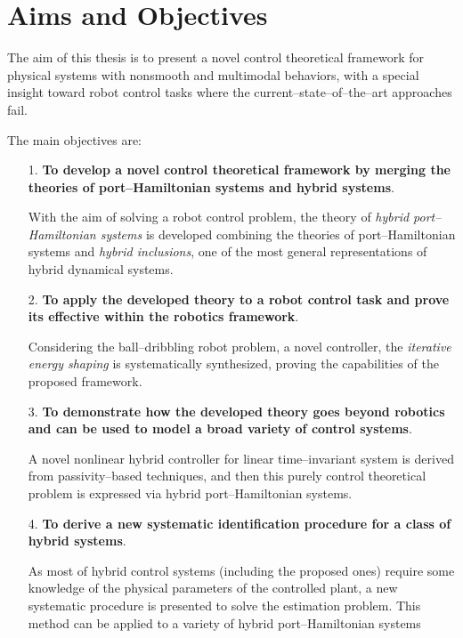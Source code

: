 \section{{Aims and Objectives}}\label{sec:aim}
The aim of this thesis is to present a novel control theoretical framework for physical systems with nonsmooth and multimodal behaviors, with a special insight toward robot control tasks where the current--state--of--the--art approaches fail.

The main objectives are:
%
\begin{itemize}
    \item [1.] \textbf{To develop a novel control theoretical framework by merging the theories of port--Hamiltonian systems and hybrid systems}.
    
    With the aim of solving a robot control problem, the theory of \textit{hybrid port--Hamiltonian systems} is developed combining the theories of port--Hamiltonian systems and \textit{hybrid inclusions}, one of the most general representations of hybrid dynamical systems.
    \newline
    \item [2.] \textbf{To apply the developed theory to a robot control task and prove its effective within the robotics framework}. 
    
    Considering the ball--dribbling robot problem, a novel controller, the \textit{iterative energy shaping} is systematically synthesized, proving the capabilities of the proposed framework.
    \newline
    \item [3.] \textbf{To demonstrate how the developed theory goes beyond robotics and can be used to model a broad variety of control systems}. 
    
    A novel nonlinear hybrid controller for linear time--invariant system is derived from passivity--based techniques, and then this purely control theoretical problem is expressed via hybrid port--Hamiltonian systems.
    \newline
    \item[4.] \textbf{To derive a new systematic identification procedure for a class of hybrid systems}.
    
    As most of hybrid control systems (including the proposed ones) require some knowledge of the physical parameters of the controlled plant, a new systematic procedure is presented to solve the estimation problem. This method can be applied to a variety of hybrid port--Hamiltonian systems 
    
    \end{itemize}
%





